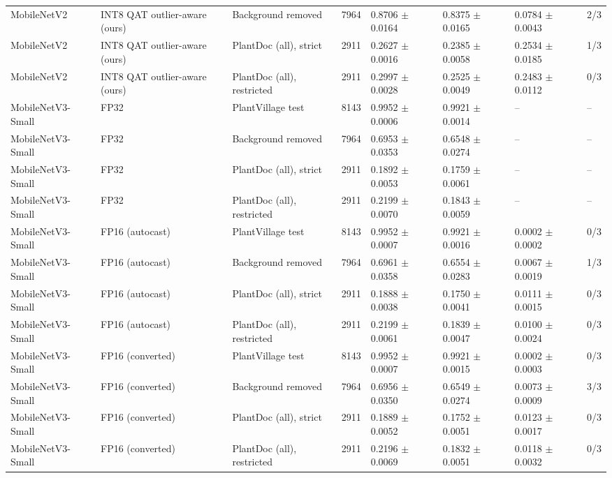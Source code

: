 \begin{table}[t]
\begin{tabular}{llllllll}
MobileNetV2 & INT8 QAT outlier-aware (ours) & Background removed & 7964 & 0.8706 $\pm$ 0.0164 & 0.8375 $\pm$ 0.0165 & 0.0784 $\pm$ 0.0043 & 2/3 \\
MobileNetV2 & INT8 QAT outlier-aware (ours) & PlantDoc (all), strict & 2911 & 0.2627 $\pm$ 0.0016 & 0.2385 $\pm$ 0.0058 & 0.2534 $\pm$ 0.0185 & 1/3 \\
MobileNetV2 & INT8 QAT outlier-aware (ours) & PlantDoc (all), restricted & 2911 & 0.2997 $\pm$ 0.0028 & 0.2525 $\pm$ 0.0049 & 0.2483 $\pm$ 0.0112 & 0/3 \\
MobileNetV3-Small & FP32 & PlantVillage test & 8143 & 0.9952 $\pm$ 0.0006 & 0.9921 $\pm$ 0.0014 & – & – \\
MobileNetV3-Small & FP32 & Background removed & 7964 & 0.6953 $\pm$ 0.0353 & 0.6548 $\pm$ 0.0274 & – & – \\
MobileNetV3-Small & FP32 & PlantDoc (all), strict & 2911 & 0.1892 $\pm$ 0.0053 & 0.1759 $\pm$ 0.0061 & – & – \\
MobileNetV3-Small & FP32 & PlantDoc (all), restricted & 2911 & 0.2199 $\pm$ 0.0070 & 0.1843 $\pm$ 0.0059 & – & – \\
MobileNetV3-Small & FP16 (autocast) & PlantVillage test & 8143 & 0.9952 $\pm$ 0.0007 & 0.9921 $\pm$ 0.0016 & 0.0002 $\pm$ 0.0002 & 0/3 \\
MobileNetV3-Small & FP16 (autocast) & Background removed & 7964 & 0.6961 $\pm$ 0.0358 & 0.6554 $\pm$ 0.0283 & 0.0067 $\pm$ 0.0019 & 1/3 \\
MobileNetV3-Small & FP16 (autocast) & PlantDoc (all), strict & 2911 & 0.1888 $\pm$ 0.0038 & 0.1750 $\pm$ 0.0041 & 0.0111 $\pm$ 0.0015 & 0/3 \\
MobileNetV3-Small & FP16 (autocast) & PlantDoc (all), restricted & 2911 & 0.2199 $\pm$ 0.0061 & 0.1839 $\pm$ 0.0047 & 0.0100 $\pm$ 0.0024 & 0/3 \\
MobileNetV3-Small & FP16 (converted) & PlantVillage test & 8143 & 0.9952 $\pm$ 0.0007 & 0.9921 $\pm$ 0.0015 & 0.0002 $\pm$ 0.0003 & 0/3 \\
MobileNetV3-Small & FP16 (converted) & Background removed & 7964 & 0.6956 $\pm$ 0.0350 & 0.6549 $\pm$ 0.0274 & 0.0073 $\pm$ 0.0009 & 3/3 \\
MobileNetV3-Small & FP16 (converted) & PlantDoc (all), strict & 2911 & 0.1889 $\pm$ 0.0052 & 0.1752 $\pm$ 0.0051 & 0.0123 $\pm$ 0.0017 & 0/3 \\
MobileNetV3-Small & FP16 (converted) & PlantDoc (all), restricted & 2911 & 0.2196 $\pm$ 0.0069 & 0.1832 $\pm$ 0.0051 & 0.0118 $\pm$ 0.0032 & 0/3 \\

\end{tabular}
\end{table}
